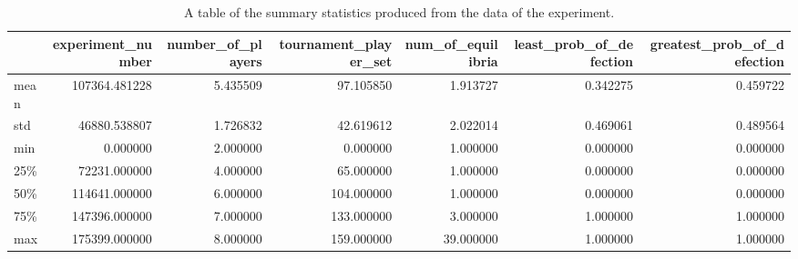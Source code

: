 \begin{table}
\centering
\caption{A table of the summary statistics produced from the data of the experiment.}
\label{tab:summary_stats}
\begin{tabular}{lrrrrrr}
\toprule
{} &  experiment\_number &  number\_of\_players &  tournament\_player\_set &  num\_of\_equilibria &  least\_prob\_of\_defection &  greatest\_prob\_of\_defection \\
\midrule
mean &      107364.481228 &           5.435509 &              97.105850 &           1.913727 &                 0.342275 &                    0.459722 \\
std  &       46880.538807 &           1.726832 &              42.619612 &           2.022014 &                 0.469061 &                    0.489564 \\
min  &           0.000000 &           2.000000 &               0.000000 &           1.000000 &                 0.000000 &                    0.000000 \\
25\%  &       72231.000000 &           4.000000 &              65.000000 &           1.000000 &                 0.000000 &                    0.000000 \\
50\%  &      114641.000000 &           6.000000 &             104.000000 &           1.000000 &                 0.000000 &                    0.000000 \\
75\%  &      147396.000000 &           7.000000 &             133.000000 &           3.000000 &                 1.000000 &                    1.000000 \\
max  &      175399.000000 &           8.000000 &             159.000000 &          39.000000 &                 1.000000 &                    1.000000 \\
\bottomrule
\end{tabular}
\end{table}
